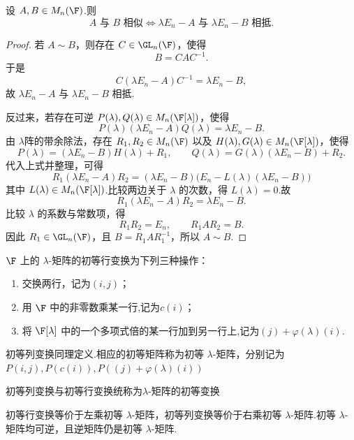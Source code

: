 \begin{proposition}
	设 $A,B\in M_n(\F)$.则
	\[
	A\text{ 与 }B\text{ 相似}
	\iff
	\lambda E_n-A\text{ 与 }\lambda E_n-B\text{ 相抵}.
	\]
\end{proposition}

\begin{proof}
	若 $A\sim B$，则存在 $C\in \GL_n(\F)$，使得
	\[
	B=CAC^{-1}.
	\]
	于是
	\[
	C(\lambda E_n-A)C^{-1}=\lambda E_n-B,
	\]
	故 $\lambda E_n-A$ 与 $\lambda E_n-B$ 相抵.
	
	反过来，若存在可逆 $P(\lambda),Q(\lambda)\in M_n(\F[\lambda])$，使得
	\[
	P(\lambda)(\lambda E_n-A)Q(\lambda)=\lambda E_n-B.
	\]
	由 $\lambda$阵的带余除法，存在 $R_1,R_2\in M_n(\F)$ 以及 $H(\lambda),G(\lambda)\in M_n(\F[\lambda])$，使得
	\[
	P(\lambda)=(\lambda E_n-B)H(\lambda)+R_1,
	\qquad
	Q(\lambda)=G(\lambda)(\lambda E_n-B)+R_2.
	\]
	代入上式并整理，可得
	\[
	R_1(\lambda E_n-A)R_2
	=(\lambda E_n-B)\bigl(E_n-L(\lambda)(\lambda E_n-B)\bigr)
	\]
	其中 $L(\lambda)\in M_n(\F[\lambda])$.比较两边关于 $\lambda$ 的次数，得 $L(\lambda)=0$.故
	\[
	R_1(\lambda E_n-A)R_2=\lambda E_n-B.
	\]
	比较 $\lambda$ 的系数与常数项，得
	\[
	R_1R_2=E_n,
	\qquad
	R_1AR_2=B.
	\]
	因此 $R_1\in \GL_n(\F)$，且 $B=R_1AR_1^{-1}$，所以 $A\sim B$.
\end{proof}

\begin{definition}[初等 $\lambda$-变换]
	$\F$ 上的 $\lambda$-矩阵的初等行变换为下列三种操作：
	\begin{enumerate}
		\item 交换两行，记为$(i,j)$；
		\item 用 $\F$ 中的非零数乘某一行,记为$c(i)$；
		\item 将 $\F[\lambda]$ 中的一个多项式倍的某一行加到另一行上,记为$(j) + \varphi (\lambda)(i)$.
	\end{enumerate}
	初等列变换同理定义.相应的初等矩阵称为初等 $\lambda$-矩阵，分别记为$P(i,j),P(c(i)),P((j)+\varphi(
	\lambda)(i))$
	
	初等列变换与初等行变换统称为$\lambda$-矩阵的初等变换
\end{definition}


	初等行变换等价于左乘初等 $\lambda$-矩阵，初等列变换等价于右乘初等 $\lambda$-矩阵.初等 $\lambda$-矩阵均可逆，且逆矩阵仍是初等 $\lambda$-矩阵.

